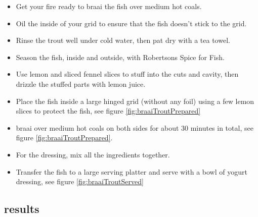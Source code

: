 \begin{itemize}
\item Get your fire ready to braai the fish over medium hot coals.
\item Oil the inside of your grid to ensure that the fish doesn't stick to the grid.
\item Rinse the trout well under cold water, then pat dry with a tea towel.
\item Season the fish, inside and outside, with Robertsons Spice for Fish. 
\item Use lemon and sliced fennel slices to stuff into the cuts and cavity, 
then drizzle the stuffed parts with lemon juice. 
\item Place the fish inside a large hinged grid (without any foil) 
using a few lemon slices to protect the fish, see figure \ref{fig:braaiTroutPrepared}


 
\item braai over medium hot coals on both sides for about 30 minutes in total, see figure \ref{fig:braaiTroutPrepared}.


\item For the dressing, mix all the ingredients together.
\item Transfer the fish to a large serving platter and serve with a bowl of yogurt dressing, see figure \ref{fig:braaiTroutServed}

\end{itemize}

\subsection*{results}
  
